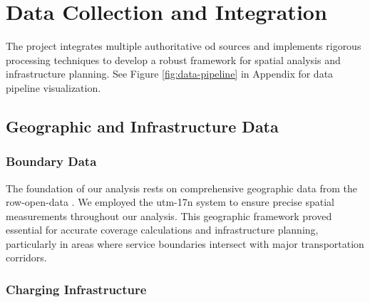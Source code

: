 \chapter{Data Collection and Integration}
The project integrates multiple authoritative \gls{od} sources and implements rigorous processing techniques to develop a robust framework for spatial analysis and infrastructure planning. See Figure \ref{fig:data-pipeline} in Appendix for data pipeline visualization.

\section{Geographic and Infrastructure Data}

\subsection{Boundary Data}


The foundation of our analysis rests on comprehensive geographic data from the \gls{row-open-data} \cite{rowdata2024}. We employed the \gls{utm-17n} system to ensure precise spatial measurements throughout our analysis. This geographic framework proved essential for accurate coverage calculations and infrastructure planning, particularly in areas where service boundaries intersect with major transportation corridors.

\subsection{Charging Infrastructure}


